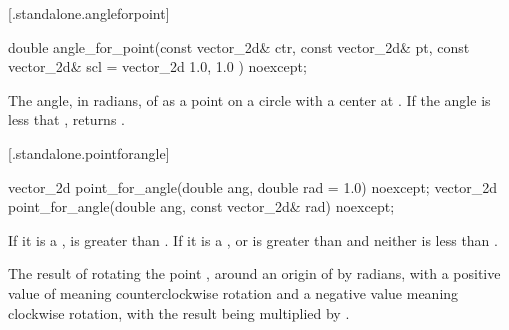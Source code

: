  [\iotwod.standalone.angleforpoint] {}

%
\begin{itemdecl}
double angle_for_point(const vector_2d& ctr, const vector_2d& pt,
  const vector_2d& scl = vector_2d{ 1.0, 1.0 }) noexcept;
\end{itemdecl}
\begin{itemdescr}
\pnum
\returns
The angle, in radians, of  as a point on a circle with a center at . If the angle is less that , returns .
\end{itemdescr}

 [\iotwod.standalone.pointforangle] {}

%
\begin{itemdecl}
vector_2d point_for_angle(double ang, double rad = 1.0) noexcept;
vector_2d point_for_angle(double ang, const vector_2d& rad) noexcept;
\end{itemdecl}
\begin{itemdescr}
\pnum
\requires
If it is a ,  is greater than . If it is a ,  or  is greater than  and neither is less than .

\returns
The result of rotating the point , around an origin of  by  radians, with a positive value of  meaning counterclockwise rotation and a negative value meaning clockwise rotation, with the result being multiplied by .
\end{itemdescr}
